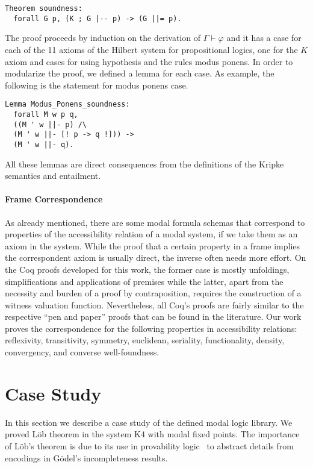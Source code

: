 \documentclass[sigconf,anonymous]{acmart}
\begin{document}
\begin{verbatim}
Theorem soundness:
  forall G p, (K ; G |-- p) -> (G ||= p).
\end{verbatim}

The proof proceeds by induction on the derivation of $\Gamma \vdash\varphi$ and
it has a case for each of the 11 axioms of the Hilbert system for propositional
logics, one for the $K$ axiom and cases for using hypothesis and the rules modus
ponens. In order to modularize the proof, we defined a lemma for each case.
As example, the following is the statement for modus ponens case.
\begin{verbatim}
Lemma Modus_Ponens_soundness:
  forall M w p q,
  ((M ' w ||- p) /\
  (M ' w ||- [! p -> q !])) ->
  (M ' w ||- q).
\end{verbatim}
All these lemmas are direct consequences from the definitions of the Kripke
semantics and entailment.

\paragraph{Frame Correspondence} 
As already mentioned, there are some modal formula schemas that correspond
to properties of the accessibility relation of a modal system, if we take them
as an axiom in the system.  While the proof that a certain property in a frame
implies the correspondent axiom is usually  direct, the inverse often needs
more effort. On the Coq proofs developed for this work,  the former case is
mostly unfoldings, simplifications and applications of premises
while the latter, apart from the necessity and burden of a proof by contraposition, 
requires the construction of a witness valuation function. 
Nevertheless, all Coq's proofs are fairly similar to the respective
``pen and paper'' proofs that  can be found in the literature. 
Our work proves the correspondence for the  following properties in
accessibility relations: reflexivity, transitivity, symmetry,  euclidean,
seriality, functionality, density, convergency, and converse well-foundness.

\section{Case Study}\label{sec:case}

In this section we describe a case study of the defined modal logic library.
We proved L\"ob theorem in the system K4 with modal fixed points.
The importance of L\"ob's theorem is due to its use in provability
logic~\cite{boolos_1994} to abstract details from encodings in G\"odel's
incompleteness results.
\end{document}
